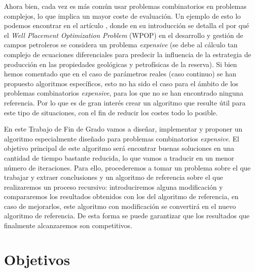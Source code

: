 Ahora bien, cada vez es más común usar problemas combinatorios en problemas complejos, lo que implica un mayor coste de evaluación. 
Un ejemplo de esto lo podemos encontrar en el artículo \parencite{demoraesDiversityPreservationMethod2022}, donde en su introducción se detalla el por qué el \textit{Well Placement Optimization Problem} (WPOP) en el desarrollo y gestión de campos petroleros se considera un problema \textit{expensive} (se debe al cálculo tan complejo de ecuaciones diferenciales para predecir la influencia de la estrategia de producción  en las propiedades geológicas y petrofísicas de la reserva). 
Si bien hemos comentado que en el caso de parámetros reales (caso continuo) se han propuesto algoritmos específicos, esto no ha sido el caso para el ámbito de los problemas combinatorios \textit{expensive}, para los que no se han encontrado ninguna referencia. 
Por lo que es de gran interés crear un algoritmo que resulte útil para este tipo de situaciones, con el fin de reducir los costes todo lo posible. 

En este Trabajo de Fin de Grado vamos a diseñar, implementar y proponer un algoritmo especialmente diseñado para problemas combinatorios \textit{expensive}. 
El objetivo principal de este algoritmo será encontrar buenas soluciones en una cantidad de tiempo bastante reducida, lo que vamos a traducir en un menor número de iteraciones. 
Para ello, procederemos a tomar un problema sobre el que trabajar y extraer conclusiones y un algoritmo de referencia sobre el que realizaremos un proceso recursivo: introduciremos alguna modificación y compararemos los resultados obtenidos con los del algoritmo de referencia, en caso de mejorarlos, este algoritmo con modificación se convertirá en el nuevo algoritmo de referencia. 
De esta forma se puede garantizar que los resultados que finalmente alcanzaremos son competitivos. 

\section{Objetivos}

